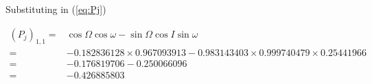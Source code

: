 \documentclass[]{article}
\begin{document}
Substituting in (\ref{eq:Pj})

\begin{align*}
(P_j)_{1,1} =& \cos \Omega \cos \omega - \sin \Omega \cos I \sin \omega \\
=& -0.182836128 \times 	0.967093913 - 0.983143403 \times 0.999740479 \times 	0.25441966\\
=& -0.176819706 - 0.250066096\\
=& -0.426885803
\end{align*}



\end{document}
